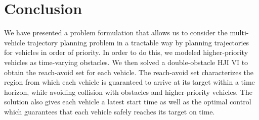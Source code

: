 \section{Conclusion}%
We have presented a problem formulation that allows us to consider the multi-vehicle trajectory planning problem in a tractable way by planning trajectories for vehicles in order of priority. In order to do this, we modeled higher-priority vehicles as time-varying obstacles. We then solved a double-obstacle HJI VI to obtain the reach-avoid set for each vehicle. The reach-avoid set characterizes the region from which each vehicle is guaranteed to arrive at its target within a time horizon, while avoiding collision with obstacles and higher-priority vehicles. The solution also gives each vehicle a latest start time as well as the optimal control which guarantees that each vehicle safely reaches its target on time. %